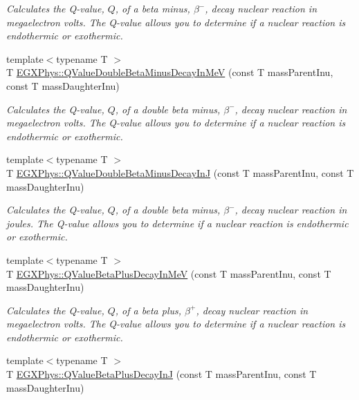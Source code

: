 \begin{DoxyCompactItemize}
\begin{DoxyCompactList}\small\item\em Calculates the Q-\/value, $Q$, of a beta minus, $\beta^-$, decay nuclear reaction in megaelectron volts. The Q-\/value allows you to determine if a nuclear reaction is endothermic or exothermic. \end{DoxyCompactList}\item 
{\footnotesize template$<$typename T $>$ }\\T \mbox{\hyperlink{group___e_g_x_phys-_q_value-_beta_minus_ga2678563115405a056c6bdccc9f2a9232}{E\+G\+X\+Phys\+::\+Q\+Value\+Double\+Beta\+Minus\+Decay\+In\+MeV}} (const T mass\+Parent\+Inu, const T mass\+Daughter\+Inu)
\begin{DoxyCompactList}\small\item\em Calculates the Q-\/value, $Q$, of a double beta minus, $\beta^-$, decay nuclear reaction in megaelectron volts. The Q-\/value allows you to determine if a nuclear reaction is endothermic or exothermic. \end{DoxyCompactList}\item 
{\footnotesize template$<$typename T $>$ }\\T \mbox{\hyperlink{group___e_g_x_phys-_q_value-_beta_minus_ga5be6923812a1a701ed38965329dd6297}{E\+G\+X\+Phys\+::\+Q\+Value\+Double\+Beta\+Minus\+Decay\+InJ}} (const T mass\+Parent\+Inu, const T mass\+Daughter\+Inu)
\begin{DoxyCompactList}\small\item\em Calculates the Q-\/value, $Q$, of a double beta minus, $\beta^-$, decay nuclear reaction in joules. The Q-\/value allows you to determine if a nuclear reaction is endothermic or exothermic. \end{DoxyCompactList}\item 
{\footnotesize template$<$typename T $>$ }\\T \mbox{\hyperlink{group___e_g_x_phys-_q_value-_beta_plus_ga3c4f7ec8e7c44d01d3aee6447a5ab443}{E\+G\+X\+Phys\+::\+Q\+Value\+Beta\+Plus\+Decay\+In\+MeV}} (const T mass\+Parent\+Inu, const T mass\+Daughter\+Inu)
\begin{DoxyCompactList}\small\item\em Calculates the Q-\/value, $Q$, of a beta plus, $\beta^+$, decay nuclear reaction in megaelectron volts. The Q-\/value allows you to determine if a nuclear reaction is endothermic or exothermic. \end{DoxyCompactList}\item 
{\footnotesize template$<$typename T $>$ }\\T \mbox{\hyperlink{group___e_g_x_phys-_q_value-_beta_plus_gaaee51753f077c9fe05188aa5b24f642e}{E\+G\+X\+Phys\+::\+Q\+Value\+Beta\+Plus\+Decay\+InJ}} (const T mass\+Parent\+Inu, const T mass\+Daughter\+Inu)

\end{DoxyCompactItemize}
